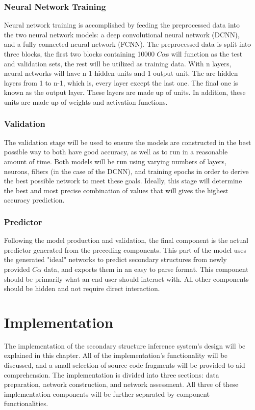 \documentclass[12pt,letterpaper,oneside,reqno]{book}
\theoremstyle{plain}
\theoremstyle{definition}
\theoremstyle{plain}
\theoremstyle{remark}
\theoremstyle{plain}
\theoremstyle{definition}
\theoremstyle{plain}
\begin{document}
\subsection{Neural Network Training}
Neural network training is accomplished by feeding the preprocessed data into the two neural network models: a deep convolutional neural network (DCNN), and a fully connected neural network (FCNN). The preprocessed data is split into three blocks, the first two blocks containing 10000 $C\alpha$s will function as the test and validation sets, the rest will be utilized as training data. With n layers, neural networks will have n-1 hidden units and 1 output unit. The are hidden layers from 1 to n-1, which is, every layer except the last one. The final one is known as the output layer. These layers are made up of units. In addition, these units are made up of weights and activation functions.
\subsection{Validation}
The validation stage will be used to ensure the models are constructed in the best possible way to both have good accuracy, as well as to run in a reasonable amount of time. Both models will be run using varying numbers of layers, neurons, filters (in the case of the DCNN), and training epochs in order to derive the best possible network to meet these goals. Ideally, this stage will determine the best and most precise combination of values that will gives the highest accuracy prediction.
\subsection{Predictor}
Following the model production and validation, the final component is the actual predictor generated from the preceding components. This part of the model uses the generated "ideal" networks to predict secondary structures from newly provided $C\alpha$ data, and exports them in an easy to parse format. This component should be primarily what an end user should interact with. All other components should be hidden and not require direct interaction.

\chapter{Implementation} \label{Implementationchapter}
The implementation of the secondary structure inference system's design will be explained in this chapter. All of the implementation's functionality will be discussed, and a small selection of source code fragments will be provided to aid comprehension. The implementation is divided into three sections: data preparation, network construction, and network assessment. All three of these implementation components will be further separated by component functionalities.
\end{document}
